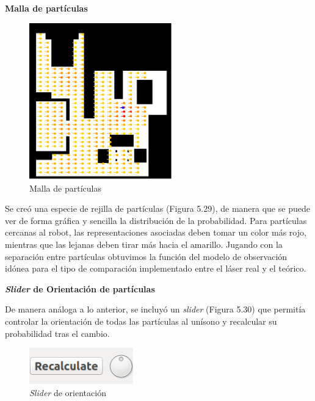 \textbf{Malla de partículas}

\begin{figure}[H]
	\begin{center}
	\includegraphics[width=0.55\textwidth]{figures/mallaparticulas.png}
	\caption{Malla de partículas}
	\label{fig.mallaparticulas}
	\end{center}
\end{figure}
Se creó una especie de rejilla de partículas (Figura 5.29), de manera que se puede ver de forma gráfica y sencilla la distribución de la probabilidad. Para partículas cercanas al robot, las representaciones asociadas deben tomar un color más rojo, mientras que las lejanas deben tirar más hacia el amarillo. Jugando con la separación entre partículas obtuvimos la función del modelo de observación idónea para el tipo de comparación implementado entre el láser real y el teórico.

\vspace{0.5cm}
\textbf{\textit{Slider} de Orientación de partículas}

De manera análoga a lo anterior, se incluyó un \textit{slider} (Figura 5.30) que permitía controlar la orientación de todas las partículas al unísono y recalcular su probabilidad tras el cambio.

\begin{figure}[H]
	\begin{center}
	\includegraphics[width=0.40\textwidth]{figures/slider.png}
	\caption{\textit{Slider} de orientación}
	\label{fig.slider}
	\end{center}
\end{figure}


